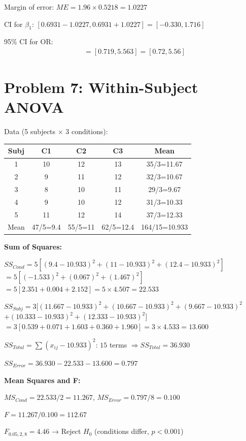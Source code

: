 \documentclass[10pt,twocolumn]{article}
\begin{document}
Margin of error: \(ME = 1.96 \times 0.5218 = 1.0227\)

CI for \(\beta_1\): \([0.6931 - 1.0227, 0.6931 + 1.0227] = [-0.330, 1.716]\)

95\% CI for OR:
\begin{align*}
[\exp(-0.330), \exp(1.716)] &= [0.719, 5.563] = \boxed{[0.72, 5.56]}
\end{align*}

\section*{Problem 7: Within-Subject ANOVA}

Data (5 subjects × 3 conditions):

\begin{small}
\begin{tabular}{c|ccc|c}
Subj & C1 & C2 & C3 & Mean \\
\hline
1 & 10 & 12 & 13 & 35/3=11.67 \\
2 & 9 & 11 & 12 & 32/3=10.67 \\
3 & 8 & 10 & 11 & 29/3=9.67 \\
4 & 9 & 10 & 12 & 31/3=10.33 \\
5 & 11 & 12 & 14 & 37/3=12.33 \\
\hline
Mean & 47/5=9.4 & 55/5=11 & 62/5=12.4 & 164/15=10.933
\end{tabular}
\end{small}

\textbf{Sum of Squares:}

\(SS_{Cond} = 5[(9.4-10.933)^2 + (11-10.933)^2 + (12.4-10.933)^2]\)
\(= 5[(-1.533)^2 + (0.067)^2 + (1.467)^2]\)
\(= 5[2.351 + 0.004 + 2.152] = 5 \times 4.507 = 22.533\)

\(SS_{Subj} = 3[(11.667-10.933)^2 + (10.667-10.933)^2 + (9.667-10.933)^2\)
\(+ (10.333-10.933)^2 + (12.333-10.933)^2]\)
\(= 3[0.539 + 0.071 + 1.603 + 0.360 + 1.960] = 3 \times 4.533 = 13.600\)

\(SS_{Total} = \sum(x_{ij} - 10.933)^2\): \(15\) terms \(\Rightarrow SS_{Total} = 36.930\)

\(SS_{Error} = 36.930 - 22.533 - 13.600 = 0.797\)

\textbf{Mean Squares and F:}

\(MS_{Cond} = 22.533/2 = 11.267\), \(MS_{Error} = 0.797/8 = 0.100\)

\(F = 11.267/0.100 = \boxed{112.67}\)

\(F_{0.05,2,8} = 4.46\) → Reject \(H_0\) (conditions differ, \(p < 0.001\))
\end{document}
